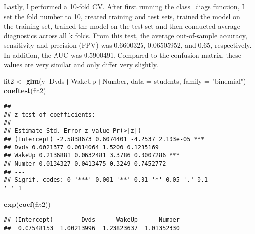 \documentclass[]{article}
\newenvironment{Shaded}{\begin{snugshade}}{\end{snugshade}}
\newcommand{\DataTypeTok}[1]{\textcolor[rgb]{0.13,0.29,0.53}{#1}}
\newcommand{\KeywordTok}[1]{\textcolor[rgb]{0.13,0.29,0.53}{\textbf{#1}}}
\newcommand{\NormalTok}[1]{#1}
\newcommand{\OperatorTok}[1]{\textcolor[rgb]{0.81,0.36,0.00}{\textbf{#1}}}
\newcommand{\StringTok}[1]{\textcolor[rgb]{0.31,0.60,0.02}{#1}}
\begin{document}
Lastly, I performed a 10-fold CV. After first running the class\_diags
function, I set the fold number to 10, created training and test sets,
trained the model on the training set, trained the model on the test set
and then conducted average diagnostics across all k folds. From this
test, the average out-of-sample accuracy, sensitivity and precision
(PPV) was 0.6600325, 0.06505952, and 0.65, respectively. In addition,
the AUC was 0.5900491. Compared to the confusion matrix, these values
are very similar and only differ very slightly.

\begin{Shaded}
\begin{Highlighting}[]
\NormalTok{fit2 <-}\StringTok{ }\KeywordTok{glm}\NormalTok{(y}\OperatorTok{~}\NormalTok{Dvds}\OperatorTok{+}\NormalTok{WakeUp}\OperatorTok{+}\NormalTok{Number, }\DataTypeTok{data =}\NormalTok{ students, }\DataTypeTok{family =} \StringTok{"binomial"}\NormalTok{)}
\KeywordTok{coeftest}\NormalTok{(fit2)}
\end{Highlighting}
\end{Shaded}

\begin{verbatim}
##
## z test of coefficients:
##
## Estimate Std. Error z value Pr(>|z|)
## (Intercept) -2.5838673 0.6074401 -4.2537 2.103e-05 ***
## Dvds 0.0021377 0.0014064 1.5200 0.1285169
## WakeUp 0.2136881 0.0632481 3.3786 0.0007286 ***
## Number 0.0134327 0.0413475 0.3249 0.7452772
## ---
## Signif. codes: 0 '***' 0.001 '**' 0.01 '*' 0.05 '.' 0.1
' ' 1
\end{verbatim}

\begin{Shaded}
\begin{Highlighting}[]
\KeywordTok{exp}\NormalTok{(}\KeywordTok{coef}\NormalTok{(fit2))}
\end{Highlighting}
\end{Shaded}

\begin{verbatim}
## (Intercept)        Dvds      WakeUp      Number 
##  0.07548153  1.00213996  1.23823637  1.01352330
\end{verbatim}
\end{document}
